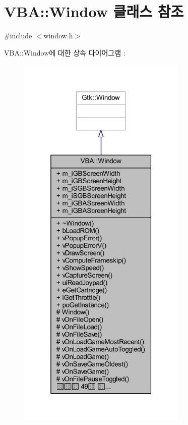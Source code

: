 \hypertarget{class_v_b_a_1_1_window}{}\section{V\+BA\+:\+:Window 클래스 참조}
\label{class_v_b_a_1_1_window}


{\ttfamily \#include $<$window.\+h$>$}



V\+BA\+:\+:Window에 대한 상속 다이어그램 \+: \nopagebreak
\begin{figure}[H]
\begin{center}
\leavevmode
\includegraphics[width=229pt]{class_v_b_a_1_1_window__inherit__graph}
\end{center}
\end{figure}


